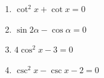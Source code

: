\documentclass[letterpaper]{article}
\begin{document}
\begin{enumerate}[resume]

\item $\cot^2x+\cot x=0$
\item $\sin2\alpha-\cos\alpha = 0$
\item $4\cos^2x-3 = 0$
\item $\csc^2x-\csc x-2 = 0$

\end{enumerate}
\end{document}
